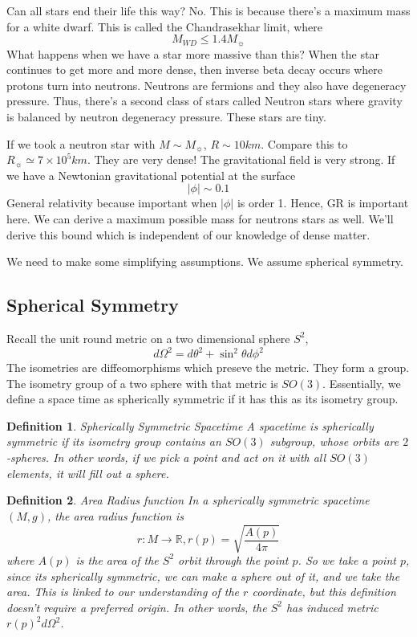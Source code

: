 \documentclass[11pt, oneside]{article}   	%
\theoremstyle{slanted}
\newtheorem*{defn}{Definition}
\begin{document}
Can all stars end their life this way? 
No. This is because there's a maximum mass for a white dwarf. 
This is called the Chandrasekhar limit, where 
\[
 M _{ WD } \leq 1.4 M _{ \sun }
\]
What happens when we have a star more massive than this? 
When the star continues to get more and more dense, 
then inverse beta decay occurs where protons turn into neutrons. 
Neutrons are fermions and they also have 
degeneracy pressure. 
Thus, there's a second class of 
stars called Neutron stars where 
gravity is balanced by neutron degeneracy pressure. 
These stars are tiny. 

If we took a neutron star with $  M \sim M _{ \sun } $, $ R \sim 10 km $. 
Compare this to  $ R _{ \sun } \simeq 7 \times 10 ^ 5 km $. 
They are very dense! The gravitational field is very strong. 
If we have a Newtonian gravitational potential at the surface 
\[
 | \phi | \sim 0.1 
\]  General relativity because important when $ | \phi | $ is order 1. 
Hence, GR is important here.
We can derive a maximum possible mass for neutrons stars as well. 
We'll derive this bound which is independent of our knowledge of dense matter. 

We need to make some 
simplifying assumptions. 
We assume spherical symmetry. 

\subsection{Spherical Symmetry}
Recall the unit round 
metric on a two dimensional sphere $ S ^ 2 $, 
\[
 d \Omega ^ 2  = d \theta ^2 + \sin ^ 2 \theta d \phi ^ 2 
\] The isometries are diffeomorphisms 
which preseve the metric. 
They form a group. 
The isometry group of a two sphere with that metric is $ SO ( 3 ) $. 
Essentially, we define a space time as spherically symmetric 
if it has this as its isometry group. 
\begin{defn}{Spherically Symmetric Spacetime}
	A spacetime is spherically symmetric if its isometry group 
	contains an $ SO ( 3 ) $ subgroup, whose orbits are
	$ 2  $-spheres. 
	In other words, if we pick a point and act on it with all 
	$ SO ( 3 ) $ elements, it will fill out a sphere. 
\end{defn}
\begin{defn}{Area Radius function}
	In a spherically symmetric spacetime $ ( M , g )$, 
	the area radius function is 
	\[
		r : M \to \mathbb{ R } , r ( p ) = \sqrt{ \frac{ A ( p ) }{ 4 \pi } } 
	\] where $ A ( p ) $ is the area of the $ S^ 2 $ orbit 
	through the point $ p $. 
	So we take a point $ p $, since its spherically symmetric, we 
	can make a sphere out of it, and we take the area. 
	This is linked to our understanding of the $ r $ coordinate, 
	but this definition doesn't require a preferred origin. 
	In other words, 
	the $ S ^ 2 $ has induced metric $ r ( p ) ^ 2 d \Omega^ 2 $. 
\end{defn}
\end{document}
